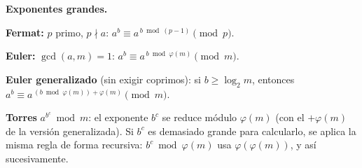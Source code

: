 \textbf{Exponentes grandes.}
\begin{props}
  \item \textbf{Fermat:} \(p\) primo, \(p \nmid a\): \(a^b \equiv a^{\,b \bmod (p-1)} \pmod p\).
  \item \textbf{Euler:} \(\gcd(a,m)=1\): \(a^b \equiv a^{\,b \bmod \varphi(m)} \pmod m\).
  \item \textbf{Euler generalizado} (sin exigir coprimos): si \(b \ge \log_2 m\), entonces \(a^b \equiv a^{\,(b \bmod \varphi(m)) + \varphi(m)} \pmod m\).
  \item \textbf{Torres} \(a^{b^c} \bmod m\): el exponente \(b^c\) se reduce módulo \(\varphi(m)\) (con el \(+\varphi(m)\) de la versión generalizada). Si \(b^c\) es demasiado grande para calcularlo, se aplica la misma regla de forma recursiva: \(b^c \bmod \varphi(m)\) usa \(\varphi(\varphi(m))\), y así sucesivamente.
\end{props}
